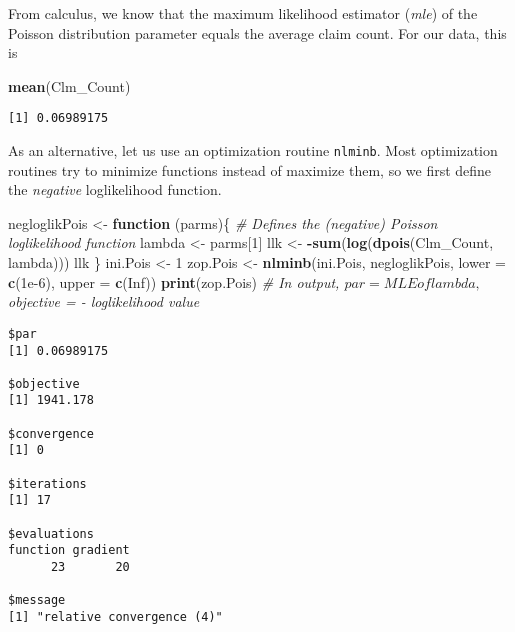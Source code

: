 \documentclass[]{book}
\newenvironment{Shaded}{\begin{snugshade}}{\end{snugshade}}
\newcommand{\KeywordTok}[1]{\textcolor[rgb]{0.13,0.29,0.53}{\textbf{#1}}}
\newcommand{\DataTypeTok}[1]{\textcolor[rgb]{0.13,0.29,0.53}{#1}}
\newcommand{\DecValTok}[1]{\textcolor[rgb]{0.00,0.00,0.81}{#1}}
\newcommand{\FloatTok}[1]{\textcolor[rgb]{0.00,0.00,0.81}{#1}}
\newcommand{\StringTok}[1]{\textcolor[rgb]{0.31,0.60,0.02}{#1}}
\newcommand{\CommentTok}[1]{\textcolor[rgb]{0.56,0.35,0.01}{\textit{#1}}}
\newcommand{\OtherTok}[1]{\textcolor[rgb]{0.56,0.35,0.01}{#1}}
\newcommand{\ControlFlowTok}[1]{\textcolor[rgb]{0.13,0.29,0.53}{\textbf{#1}}}
\newcommand{\OperatorTok}[1]{\textcolor[rgb]{0.81,0.36,0.00}{\textbf{#1}}}
\newcommand{\NormalTok}[1]{#1}
\theoremstyle{definition}
\theoremstyle{definition}
\theoremstyle{definition}
\theoremstyle{remark}
\begin{document}
From calculus, we know that the maximum likelihood estimator
(\emph{mle}) of the Poisson distribution parameter equals the average
claim count. For our data, this is

\begin{Shaded}
\begin{Highlighting}[]
\KeywordTok{mean}\NormalTok{(Clm_Count)}
\end{Highlighting}
\end{Shaded}

\begin{verbatim}
[1] 0.06989175
\end{verbatim}

As an alternative, let us use an optimization routine \texttt{nlminb}.
Most optimization routines try to minimize functions instead of maximize
them, so we first define the \emph{negative} loglikelihood function.

\begin{Shaded}
\begin{Highlighting}[]
\NormalTok{negloglikPois <-}\StringTok{ }\ControlFlowTok{function}\NormalTok{ (parms)\{}
\CommentTok{# Defines the (negative) Poisson loglikelihood function  }
\NormalTok{  lambda <-}\StringTok{ }\NormalTok{parms[}\DecValTok{1}\NormalTok{]}
\NormalTok{  llk <-}\StringTok{ }\OperatorTok{-}\KeywordTok{sum}\NormalTok{(}\KeywordTok{log}\NormalTok{(}\KeywordTok{dpois}\NormalTok{(Clm_Count, lambda)))}
\NormalTok{  llk}
\NormalTok{\} }
\NormalTok{ini.Pois <-}\StringTok{ }\DecValTok{1} 
\NormalTok{zop.Pois <-}\StringTok{ }\KeywordTok{nlminb}\NormalTok{(ini.Pois, negloglikPois, }\DataTypeTok{lower =} \KeywordTok{c}\NormalTok{(}\FloatTok{1e-6}\NormalTok{), }\DataTypeTok{upper =} \KeywordTok{c}\NormalTok{(}\OtherTok{Inf}\NormalTok{))}
\KeywordTok{print}\NormalTok{(zop.Pois)  }\CommentTok{# In output, $par = MLE of lambda, $objective = - loglikelihood value}
\end{Highlighting}
\end{Shaded}

\begin{verbatim}
$par
[1] 0.06989175

$objective
[1] 1941.178

$convergence
[1] 0

$iterations
[1] 17

$evaluations
function gradient 
      23       20 

$message
[1] "relative convergence (4)"
\end{verbatim}
\end{document}
